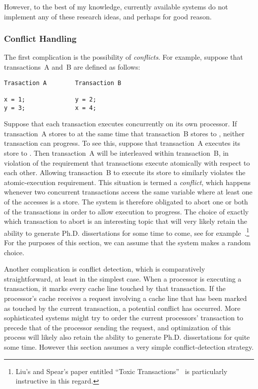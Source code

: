 However, to the best of my knowledge, currently available systems do
not implement any of these research ideas, and perhaps for good reason.

\subsubsection{Conflict Handling}
\label{sec:future:Conflict Handling}

The first complication is the possibility of \emph{conflicts}.
For example, suppose that transactions~A and~B are defined as follows:

\vspace{5pt}
\begin{minipage}[t]{\columnwidth}
\begin{verbatim}
Trasaction A        Transaction B

x = 1;              y = 2;
y = 3;              x = 4;
\end{verbatim}
\end{minipage}
\vspace{5pt}

Suppose that each transaction executes concurrently on its own processor.
If transaction~A stores to  at the same time that transaction~B
stores to , neither transaction can progress.
To see this, suppose that transaction~A executes its store to .
Then transaction~A will be interleaved within transaction~B, in violation
of the requirement that transactions execute atomically with respect to
each other.
Allowing transaction~B to execute its store to  similarly violates
the atomic-execution requirement.
This situation is termed a \emph{conflict}, which happens whenever two
concurrent transactions access the same variable where at least one of
the accesses is a store.
The system is therefore obligated to abort one or both of the transactions
in order to allow execution to progress.
The choice of exactly which transaction to abort is an interesting topic
that will very likely retain the ability to generate Ph.D. dissertations for
some time to come, see for
example~\cite{EgeAkpinar2011HTM2TLE}.\footnote{
	Liu's and Spear's paper entitled ``Toxic
	Transactions''~\cite{YujieLiu2011ToxicTransactions} is
	particularly instructive in this regard.}
For the purposes of this section, we can assume that the system makes
a random choice.

Another complication is conflict detection, which is comparatively
straightforward, at least in the simplest case.
When a processor is executing a transaction, it marks every cache line
touched by that transaction.
If the processor's cache receives a request involving a cache line that
has been marked as touched by the current transaction, a potential
conflict has occurred.
More sophisticated systems might try to order the current processors'
transaction to precede that of the processor sending the request,
and optimization of this process will likely also retain the ability
to generate Ph.D. dissertations for quite some time.
However this section assumes a very simple conflict-detection strategy.

